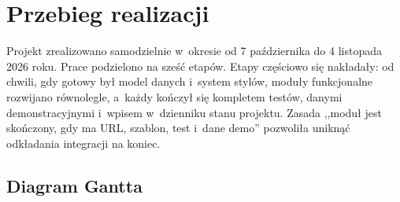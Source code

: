 \chapter{Przebieg realizacji}

Projekt zrealizowano samodzielnie w~okresie od 7 października do 4 listopada 2026 roku.
Prace podzielono na sześć etapów. Etapy częściowo się nakładały: od chwili, gdy gotowy był
model danych i~system stylów, moduły funkcjonalne rozwijano równolegle, a~każdy kończył się
kompletem testów, danymi demonstracyjnymi i~wpisem w~dzienniku stanu projektu. Zasada
,,moduł jest skończony, gdy ma URL, szablon, test i~dane demo'' pozwoliła uniknąć
odkładania integracji na koniec.

\section{Diagram Gantta}

